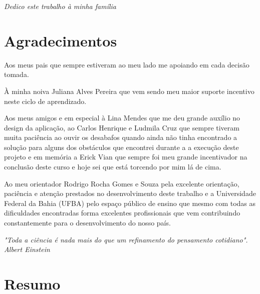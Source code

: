 \documentclass[12pt, a4paper]{report}
\begin{document}
\newpage
\vspace*{21.9cm}
\begin{flushright}
\textit{Dedico este trabalho à minha família}
\end{flushright}


\newpage
\chapter*{Agradecimentos}
\thispagestyle{empty}
Aos meus pais que sempre estiveram ao meu lado me apoiando em cada decisão tomada.

À minha noiva Juliana Alves Pereira que vem sendo meu maior suporte incentivo neste ciclo de aprendizado. 

Aos meus amigos e em especial à Lina Mendes que me deu grande auxílio no design da aplicação, ao Carlos Henrique e Ludmila Cruz que sempre tiveram muita paciência ao ouvir os desabafos quando ainda não tinha encontrado a solução para alguns dos obstáculos que encontrei durante a a execução deste projeto e em memória a Erick Vian que sempre foi meu grande incentivador na conclusão deste curso e hoje sei que está torcendo por mim lá de cima.

Ao meu orientador Rodrigo Rocha Gomes e Souza pela excelente orientação, paciência e atenção prestados no desenvolvimento deste trabalho e a Universidade Federal da Bahia (UFBA) pelo espaço público de ensino que mesmo com todas as dificuldades encontradas forma excelentes profissionais que vem contribuindo constantemente para o desenvolvimento do nosso país.  

\newpage
\vspace*{20cm}
\begin{flushright}
\begin{minipage}{8cm}
\begin{flushright}
\textit{
"Toda a ciência é nada mais do que um refinamento do pensamento cotidiano". \\
Albert Einstein}
\end{flushright}
\end{minipage}
\end{flushright}


\newpage
\chapter*{Resumo}
\thispagestyle{empty}
 
\end{document}
